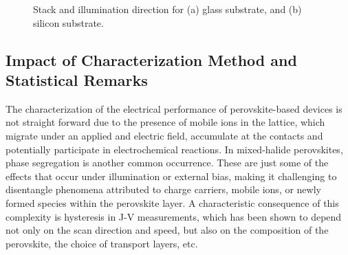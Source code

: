 \begin{figure}[htbp]
    \caption{Stack and illumination direction for (a) glass substrate, and (b) silicon substrate.}
    \label{fig:ch2:types_of_stacks}
\end{figure}

\subsection{Impact of Characterization Method and Statistical Remarks}

The characterization of the electrical performance of perovskite-based devices is not straight forward due to the presence of mobile ions in the lattice, which migrate under an applied and electric field, accumulate at the contacts and potentially participate in electrochemical reactions. In mixed-halide perovskites, phase segregation is another common occurrence. These are just some of the effects that occur under illumination or external bias, making it challenging to disentangle phenomena attributed to charge carriers, mobile ions, or newly formed species within the perovskite layer. A characteristic consequence of this complexity is hysteresis in J-V measurements, which has been shown to depend not only on the scan direction and speed, but also on the composition of the perovskite, the choice of transport layers, etc. 

